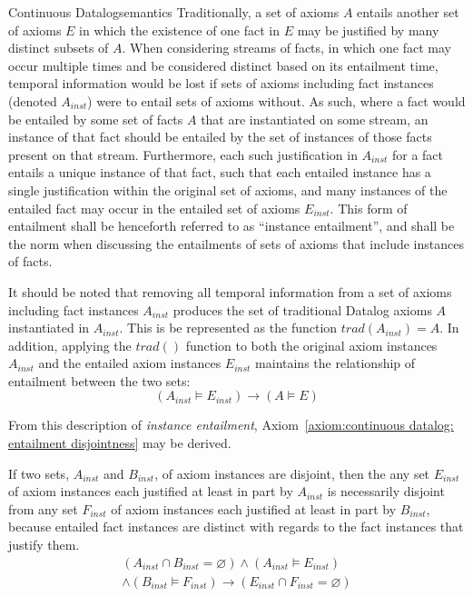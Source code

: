 \begin{nestedsection}{Continuous Datalog}{semantics}
	Traditionally, a set of axioms $A$ entails another set of axioms $E$ in which the existence of one fact in $E$ may be justified by many distinct subsets of $A$.
	When considering streams of facts, in which one fact may occur multiple times and be considered distinct based on its entailment time, temporal information would be lost if sets of axioms including fact instances (denoted $A_{inst}$) were to entail sets of axioms without.
	As such, where a fact would be entailed by some set of facts $A$ that are instantiated on some stream, an instance of that fact should be entailed by the set of instances of those facts present on that stream.
	Furthermore, each such justification in $A_{inst}$ for a fact entails a unique instance of that fact, such that each entailed instance has a single justification within the original set of axioms, and many instances of the entailed fact may occur in the entailed set of axioms $E_{inst}$.
	This form of entailment shall be henceforth referred to as ``instance entailment'', and shall be the norm when discussing the entailments of sets of axioms that include instances of facts.
	
	It should be noted that removing all temporal information from a set of axioms including fact instances $A_{inst}$ produces the set of traditional Datalog axioms $A$ instantiated in $A_{inst}$.
	This is be represented as the function ${trad\left( A_{inst} \right) = A}$.
	In addition, applying the ${trad()}$ function to both the original axiom instances $A_{inst}$ and the entailed axiom instances $E_{inst}$ maintains the relationship of entailment between the two sets:
	\[ \left( A_{inst} \vDash E_{inst} \right) \rightarrow \left( A \vDash E \right) \]

	From this description of \emph{instance entailment}, Axiom~\ref{axiom:continuous datalog: entailment disjointness} may be derived.

	\begin{axiom}\label{axiom:continuous datalog: entailment disjointness}
		If two sets, $A_{inst}$ and $B_{inst}$, of axiom instances are disjoint, then the any set $E_{inst}$ of axiom instances each justified at least in part by $A_{inst}$ is necessarily disjoint from any set $F_{inst}$ of axiom instances each justified at least in part by $B_{inst}$, because entailed fact instances are distinct with regards to the fact instances that justify them.
		\begin{multline*}
			\left( A_{inst} \cap B_{inst} = \varnothing \right) \wedge \left( A_{inst} \vDash E_{inst} \right) \\
				\wedge \left( B_{inst} \vDash F_{inst} \right) \rightarrow \left( E_{inst} \cap F_{inst} = \varnothing \right)
		\end{multline*}
	\end{axiom}


\end{nestedsection}
